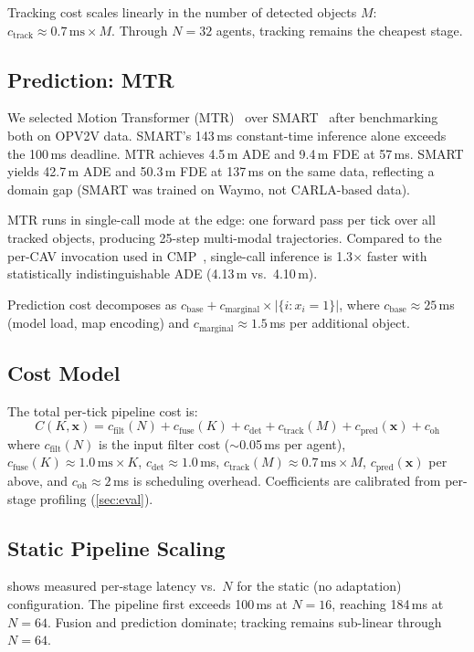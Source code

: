 Tracking cost scales linearly in the number of detected objects $M$:
$c_{\mathrm{track}} \approx 0.7\,\text{ms} \times M$.  Through
$N=32$ agents, tracking remains the cheapest stage.

\subsection{Prediction: MTR}

We selected Motion Transformer (MTR)~\cite{shi2022mtr} over
SMART~\cite{wu2024smart} after benchmarking both on OPV2V data.
SMART's 143\,ms constant-time inference alone exceeds the 100\,ms
deadline.  MTR achieves 4.5\,m ADE and 9.4\,m FDE at 57\,ms.
SMART yields 42.7\,m ADE and 50.3\,m FDE at 137\,ms on the same
data, reflecting a domain gap (SMART was trained on Waymo, not
CARLA-based data).

MTR runs in single-call mode at the edge: one forward pass per tick
over all tracked objects, producing 25-step multi-modal trajectories.
Compared to the per-CAV invocation used in CMP~\cite{cmp2024},
single-call inference is 1.3$\times$ faster with statistically
indistinguishable ADE (4.13\,m vs.\ 4.10\,m).

Prediction cost decomposes as $c_{\mathrm{base}} + c_{\mathrm{marginal}}
\times |\{i : x_i = 1\}|$, where $c_{\mathrm{base}} \approx 25\,$ms
(model load, map encoding) and $c_{\mathrm{marginal}} \approx 1.5\,$ms
per additional object.

\subsection{Cost Model}

The total per-tick pipeline cost is:
\begin{equation}
  C(K, \mathbf{x}) = c_{\mathrm{filt}}(N) + c_{\mathrm{fuse}}(K)
    + c_{\mathrm{det}} + c_{\mathrm{track}}(M)
    + c_{\mathrm{pred}}(\mathbf{x}) + c_{\mathrm{oh}}
  \label{eq:cost}
\end{equation}
where $c_{\mathrm{filt}}(N)$ is the input filter cost ($\sim$0.05\,ms
per agent), $c_{\mathrm{fuse}}(K) \approx 1.0\,\text{ms} \times K$,
$c_{\mathrm{det}} \approx 1.0\,$ms, $c_{\mathrm{track}}(M)
\approx 0.7\,\text{ms} \times M$, $c_{\mathrm{pred}}(\mathbf{x})$
per above, and $c_{\mathrm{oh}} \approx 2\,$ms is scheduling overhead.
Coefficients are calibrated from per-stage profiling
(\cref{sec:eval}).

\subsection{Static Pipeline Scaling}

 shows measured per-stage latency vs.\ $N$
for the static (no adaptation) configuration.  The pipeline first
exceeds 100\,ms at $N=16$, reaching 184\,ms at $N=64$.  Fusion and
prediction dominate; tracking remains sub-linear through $N=64$.

